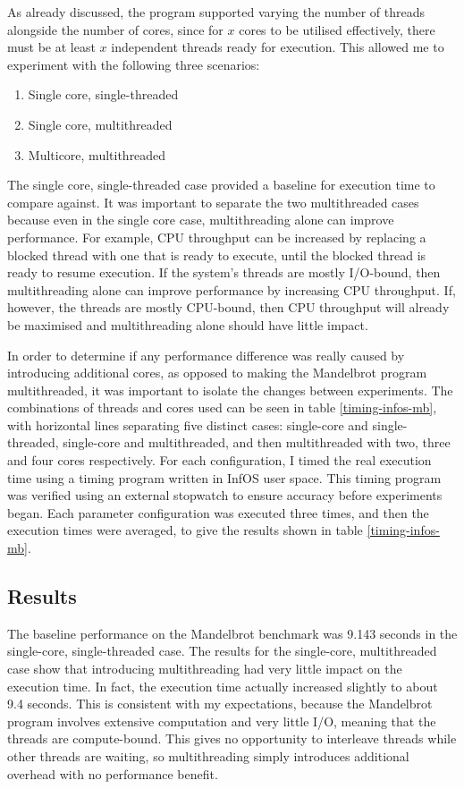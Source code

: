 \documentclass[bsc,frontabs,singlespacing,parskip,deptreport]{infthesis}
\begin{document}
As already discussed, the program supported varying the number of threads alongside the number of cores, since for $x$ cores to be utilised effectively, there must be at least $x$ independent threads ready for execution. This allowed me to experiment with the following three scenarios:

\begin{enumerate}
    \item Single core, single-threaded 
    \item Single core, multithreaded 
    \item Multicore, multithreaded
\end{enumerate}

The single core, single-threaded case provided a baseline for execution time to compare against. It was important to separate the two multithreaded cases because even in the single core case, multithreading alone can improve performance. For example, CPU throughput can be increased by replacing a blocked thread with one that is ready to execute, until the blocked thread is ready to resume execution. If the system's threads are mostly I/O-bound, then multithreading alone can improve performance by increasing CPU throughput. If, however, the threads are mostly CPU-bound, then CPU throughput will already be maximised and multithreading alone should have little impact. 

In order to determine if any performance difference was really caused by introducing additional cores, as opposed to making the Mandelbrot program multithreaded, it was important to isolate the changes between experiments. The combinations of threads and cores used can be seen in table \ref{timing-infos-mb}, with horizontal lines separating five distinct cases: single-core and single-threaded, single-core and multithreaded, and then multithreaded with two, three and four cores respectively. For each configuration, I timed the real execution time using a timing program written in InfOS user space. This timing program was verified using an external stopwatch to ensure accuracy before experiments began. Each parameter configuration was executed three times, and then the execution times were averaged, to give the results shown in table \ref{timing-infos-mb}.

\subsection{Results} \label{mb-benchmark-results}
The baseline performance on the Mandelbrot benchmark was 9.143 seconds in the single-core, single-threaded case. The results for the single-core, multithreaded case show that introducing multithreading had very little impact on the execution time. In fact, the execution time actually increased slightly to about 9.4 seconds. This is consistent with my expectations, because the Mandelbrot program involves extensive computation and very little I/O, meaning that the threads are compute-bound. This gives no opportunity to interleave threads while other threads are waiting, so multithreading simply introduces additional overhead with no performance benefit.
\end{document}
